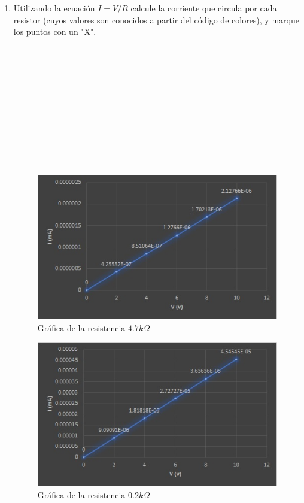 \begin{enumerate}
		
		\item Utilizando la ecuación $I=V/R$ calcule la corriente que circula por cada resistor (cuyos valores son conocidos a partir del código de colores), y marque los puntos con un "X".
		\\
		\\
		\\
		\\
		\\
		\\
		\\
		\\
		\\
		\\
		\\
		\\
			\begin{figure}[h]
			\centering
			\includegraphics[scale=1]{imagenes/10.2}
			\caption{Gráfica de la resistencia $4.7k\Omega$}
		\end{figure}
		\begin{figure}[h]
			\centering
			\includegraphics[scale=1]{imagenes/10.1}
			\caption{Gráfica de la resistencia $0.2k\Omega$}
		\end{figure}
	
	\end{enumerate}

